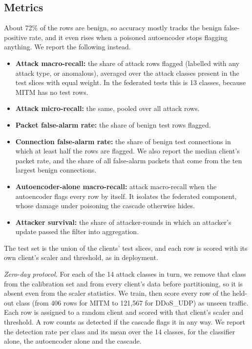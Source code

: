 \subsection{Metrics}
About 72\% of the rows are benign, so accuracy mostly tracks the benign false-positive rate, and it even rises when a poisoned autoencoder stops flagging anything. We report the following instead.
\begin{itemize}
  \item \textbf{Attack macro-recall:} the share of attack rows flagged (labelled with any attack type, or anomalous), averaged over the attack classes present in the test slices with equal weight. In the federated tests this is 13 classes, because MITM has no test rows.
  \item \textbf{Attack micro-recall:} the same, pooled over all attack rows.
  \item \textbf{Packet false-alarm rate:} the share of benign test rows flagged.
  \item \textbf{Connection false-alarm rate:} the share of benign test connections in which at least half the rows are flagged. We also report the median client's packet rate, and the share of all false-alarm packets that come from the ten largest benign connections.
  \item \textbf{Autoencoder-alone macro-recall:} attack macro-recall when the autoencoder flags every row by itself. It isolates the federated component, whose damage under poisoning the cascade otherwise hides.
  \item \textbf{Attacker survival:} the share of attacker-rounds in which an attacker's update passed the filter into aggregation.
\end{itemize}
The test set is the union of the clients' test slices, and each row is scored with its own client's scaler and threshold, as in deployment.

\textit{Zero-day protocol.} For each of the 14 attack classes in turn, we remove that class from the calibration set and from every client's data before partitioning, so it is absent even from the scaler statistics. We train, then score every row of the held-out class (from 406 rows for MITM to 121,567 for DDoS\_UDP) as unseen traffic. Each row is assigned to a random client and scored with that client's scaler and threshold. A row counts as detected if the cascade flags it in any way. We report the detection rate per class and its mean over the 14 classes, for the classifier alone, the autoencoder alone and the cascade.


